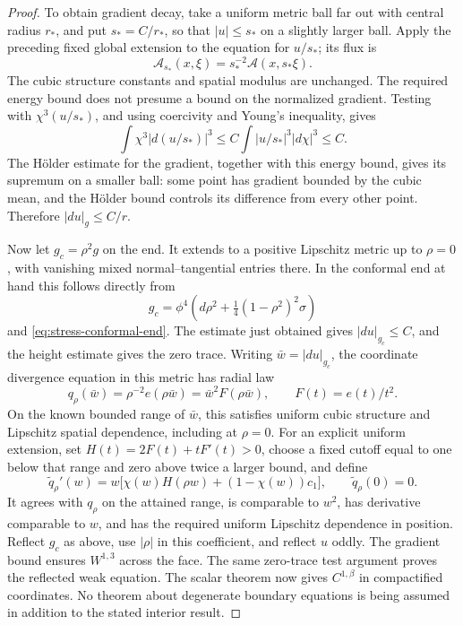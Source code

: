 \begin{proof}
To obtain gradient decay, take a uniform metric ball far out with
central radius $r_*$, and put $s_*=C/r_*$, so that $|u|\le s_*$ on a
slightly larger ball.  Apply the preceding fixed global extension
to the equation for $u/s_*$; its flux is
\[
 \mathcal A_{s_*}(x,\xi)=s_*^{-2}\mathcal A(x,s_*\xi).
\]
The cubic structure constants and spatial modulus are unchanged.
The required energy bound does not presume a bound on the normalized
gradient.  Testing with $\chi^3(u/s_*)$, and using coercivity and
Young's inequality, gives
\begin{equation}
 \int\chi^3|d(u/s_*)|^3
 \le C\int |u/s_*|^3|d\chi|^3\le C.
 \label{eq:stress-scaled-energy}
\end{equation}
The H\"older estimate for the gradient, together with this energy
bound, gives its supremum on a smaller ball: some point has gradient
bounded by the cubic mean, and the H\"older bound controls its
difference from every other point.  Therefore $|du|_g\le C/r$.

Now let $g_c=\rho^2g$ on the end.  It extends to a positive Lipschitz
metric up to $\rho=0$, with vanishing mixed normal--tangential entries
there.  In the conformal end at hand this follows directly from
\[
 g_c=\phi^4\left(d\rho^2+\tfrac14(1-\rho^2)^2\sigma\right)
\]
and \eqref{eq:stress-conformal-end}.  The estimate just obtained gives
$|du|_{g_c}\le C$, and the height estimate gives the zero trace.
Writing $\bar w=|du|_{g_c}$, the coordinate divergence equation in
this metric has radial law
\begin{equation}
 q_\rho(\bar w)=\rho^{-2}e(\rho\bar w)
              =\bar w^2 F(\rho\bar w),
 \qquad F(t)=e(t)/t^2.
 \label{eq:stress-compactified-law}
\end{equation}
On the known bounded range of $\bar w$, this satisfies uniform cubic
structure and Lipschitz spatial dependence, including at $\rho=0$.
For an explicit uniform extension, set
$H(t)=2F(t)+tF'(t)>0$, choose a fixed cutoff equal to one below that
range and zero above twice a larger bound, and define
\[
 \widetilde q_\rho'(w)
 =w\big[\chi(w)H(\rho w)+(1-\chi(w))c_1\big],
 \qquad \widetilde q_\rho(0)=0.
\]
It agrees with $q_\rho$ on the attained range, is comparable to
$w^2$, has derivative comparable to $w$, and has the required uniform
Lipschitz dependence in position.  Reflect $g_c$ as above, use
$|\rho|$ in this coefficient, and reflect $u$ oddly.  The gradient
bound ensures $W^{1,3}$ across the face.  The same zero-trace test
argument proves the reflected weak equation.  The scalar theorem
now gives $C^{1,\beta}$ in compactified coordinates.  No theorem
about degenerate boundary equations is being assumed in addition
to the stated interior result.


\end{proof}
